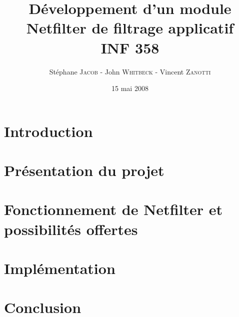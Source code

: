 \documentclass[a4paper,12pt]{article}
\title{Développement d'un module Netfilter de filtrage applicatif\\INF 358}
\author{Stéphane \textsc{Jacob} - John \textsc{Whitbeck} - Vincent \textsc{Zanotti}}
\date{15 mai 2008}
\begin{document}
\maketitle

\section*{Introduction}

\newpage

\section{Présentation du projet}

\newpage

\section{Fonctionnement de Netfilter et possibilités offertes}

\newpage

\section{Implémentation}


\section*{Conclusion}


\nocite{RW}
\nocite{C}
\nocite{S}

\newpage
{}

\end{document}
